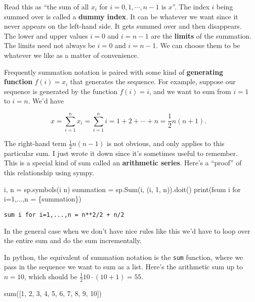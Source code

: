 \documentclass[
  letterpaper,
  DIV=11,
  numbers=noendperiod]{scrreprt}
\newenvironment{Shaded}{\begin{snugshade}}{\end{snugshade}}
\newcommand{\BuiltInTok}[1]{\textcolor[rgb]{0.00,0.23,0.31}{#1}}
\newcommand{\DecValTok}[1]{\textcolor[rgb]{0.68,0.00,0.00}{#1}}
\newcommand{\NormalTok}[1]{\textcolor[rgb]{0.00,0.23,0.31}{#1}}
\newcommand{\OperatorTok}[1]{\textcolor[rgb]{0.37,0.37,0.37}{#1}}
\newcommand{\SpecialCharTok}[1]{\textcolor[rgb]{0.37,0.37,0.37}{#1}}
\newcommand{\SpecialStringTok}[1]{\textcolor[rgb]{0.13,0.47,0.30}{#1}}
\newcommand{\StringTok}[1]{\textcolor[rgb]{0.13,0.47,0.30}{#1}}
\begin{document}
Read this as ``the sum of all \(x_i\) for \(i=0,1,\cdots,n-1\) is
\(x\)''. The index \(i\) being summed over is called a \textbf{dummy
index}. It can be whatever we want since it never appears on the
left-hand side. It gets summed over and then disappears. The lower and
upper values \(i=0\) and \(i=n-1\) are the \textbf{limits} of the
summation. The limits need not always be \(i=0\) and \(i=n-1\). We can
choose them to be whatever we like as a matter of convenience.

Frequently summation notation is paired with some kind of
\textbf{generating function} \(f(i) = x_i\) that generates the sequence.
For example, suppose our sequence is generated by the function
\(f(i) = i\), and we want to sum from \(i=1\) to \(i=n\). We'd have

\[x = \sum_{i=1}^n x_i = \sum_{i=1}^n i = 1 + 2 + \cdots + n = \frac{1}{2} n(n+1).\]

The right-hand term \(\frac{1}{2} n(n-1)\) is not obvious, and only
applies to this particular sum. I just wrote it down since it's
sometimes useful to remember. This is a special kind of sum called an
\textbf{arithmetic series}. Here's a ``proof'' of this relationship
using sympy.

\begin{Shaded}
\begin{Highlighting}[]
\NormalTok{i, n }\OperatorTok{=}\NormalTok{ sp.symbols(}\StringTok{\textquotesingle{}i n\textquotesingle{}}\NormalTok{)}
\NormalTok{summation }\OperatorTok{=}\NormalTok{ sp.Sum(i, (i, }\DecValTok{1}\NormalTok{, n)).doit()}
\BuiltInTok{print}\NormalTok{(}\SpecialStringTok{f\textquotesingle{}sum i for i=1,...,n = }\SpecialCharTok{\{}\NormalTok{summation}\SpecialCharTok{\}}\SpecialStringTok{\textquotesingle{}}\NormalTok{)}
\end{Highlighting}
\end{Shaded}

\begin{verbatim}
sum i for i=1,...,n = n**2/2 + n/2
\end{verbatim}

In the general case when we don't have nice rules like this we'd have to
loop over the entire sum and do the sum incrementally.

In python, the equivalent of summation notation is the \texttt{sum}
function, where we pass in the sequence we want to sum as a list. Here's
the arithmetic sum up to \(n=10\), which should be
\(\frac{1}{2} 10 \cdot (10+1) = 55\).

\begin{Shaded}
\begin{Highlighting}[]
\BuiltInTok{sum}\NormalTok{([}\DecValTok{1}\NormalTok{, }\DecValTok{2}\NormalTok{, }\DecValTok{3}\NormalTok{, }\DecValTok{4}\NormalTok{, }\DecValTok{5}\NormalTok{, }\DecValTok{6}\NormalTok{, }\DecValTok{7}\NormalTok{, }\DecValTok{8}\NormalTok{, }\DecValTok{9}\NormalTok{, }\DecValTok{10}\NormalTok{])}
\end{Highlighting}
\end{Shaded}
\end{document}
